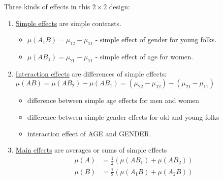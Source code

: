 Three kinds of effects in this $2 \times 2$ design:
\begin{enumerate}
	\item \underline{Simple effects} are simple contrasts.
	    \begin{itemize}
	    	\item $\mu(A_1 B) = \mu_{12} - \mu_{11}$ - simple effect of gender for young folks.
	    	\item $\mu(A B_1) = \mu_{21} - \mu_{11}$ - simple effect of age for women. 
	    \end{itemize}
    \item \underline{Interaction effects} are differences of simple effects:
    $\mu(AB) = \mu(AB_2) - \mu(AB_1) = (\mu_{22} - \mu_{12}) - (\mu_{21} - \mu_{11})$
    \begin{itemize}
    	\item difference between simple age effects for men and women
    	\item difference between simple gender effects for old and young folks
    	\item interaction effect of AGE and GENDER.
    \end{itemize}
    \item \underline{Main effects} are averages or sums of simple effects
    $$
    \begin{aligned}
    	\mu(A) &= \frac{1}{2} (\mu(AB_1) + \mu(AB_2))\\
    	\mu(B) &= \frac{1}{2} (\mu(A_1 B) + \mu(A_2B))\\    	
    \end{aligned}
    $$
\end{enumerate}








